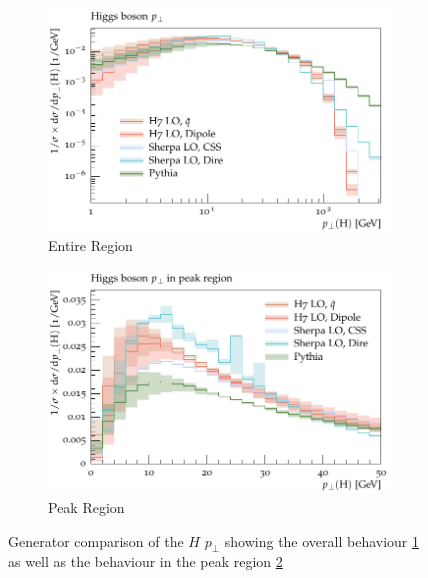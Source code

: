 \begin{figure}[h]
  \centering
  \begin{subfigure}[t]{0.49\textwidth}
    \includegraphics[width=\textwidth]{plots/H-125-MuShower/LH_H/X_pT.pdf}
    \caption{Entire Region}
    \label{fig:h:pt_full}
  \end{subfigure}
%
  \begin{subfigure}[t]{0.49\textwidth}
    \includegraphics[width=\textwidth]{plots/H-125-MuShower/LH_H/X_pT_peak.pdf}
    \caption{Peak Region}
    \label{fig:h:pt_peak}
  \end{subfigure}
  \caption{Generator comparison of the $H$ $p_\perp$ showing the overall behaviour \ref{fig:h:pt_full} as well as the behaviour in the peak region \ref{fig:h:pt_peak}}
  \label{fig:h:pt}
\end{figure}

